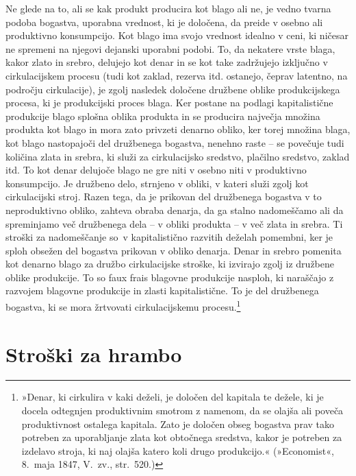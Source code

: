 \documentclass[kapital_02.tex]{subfiles}
\begin{document}
Ne glede na to, ali se kak produkt producira kot blago ali ne, je vedno tvarna podoba bogastva, uporabna vrednost, ki je določena, da preide v osebno ali produktivno konsumpcijo.
Kot blago ima svojo vrednost idealno v ceni, ki ničesar ne spremeni na njegovi dejanski uporabni podobi.
To, da nekatere vrste blaga, kakor zlato in srebro, delujejo kot denar in se kot take zadržujejo izključno v cirkulacijskem procesu (tudi kot zaklad, rezerva itd. ostanejo, čeprav latentno, na področju cirkulacije), je zgolj nasledek določene družbene oblike produkcijskega procesa, ki je produkcijski proces blaga.
Ker postane na podlagi kapitalistične produkcije blago splošna oblika produkta in se producira največja množina produkta kot blago in mora zato privzeti denarno obliko, ker torej množina blaga, kot blago nastopajoči del družbenega bogastva, nenehno raste -- se povečuje tudi količina zlata in srebra, ki služi za cirkulacijsko sredstvo, plačilno sredstvo, zaklad itd.
To kot denar delujoče blago ne gre niti v osebno niti v produktivno konsumpcijo.
Je družbeno delo, strnjeno v obliki, v kateri služi zgolj kot cirkulacijski stroj.
Razen tega, da je prikovan del družbenega bogastva v to neproduktivno obliko, zahteva obraba denarja, da ga stalno nadomeščamo ali da spreminjamo več družbenega dela -- v obliki produkta -- v več zlata in srebra.
Ti stroški za nadomeščanje so\KPEstran\ v kapitalistično razvitih deželah pomembni, ker je sploh obsežen del bogastva prikovan v obliko denarja.
Denar in srebro pomenita kot denarno blago za družbo cirkulacijske stroške, ki izvirajo zgolj iz družbene oblike produkcije.
To so faux frais blagovne produkcije nasploh, ki naraščajo z razvojem blagovne produkcije in zlasti kapitalistične.
To je del družbenega bogastva, ki se mora žrtvovati cirkulacijskemu procesu.\footnote
{»Denar, ki cirkulira v kaki deželi, je določen del kapitala te dežele, ki je docela odtegnjen produktivnim smotrom z namenom, da se olajša ali poveča produktivnost ostalega kapitala.
Zato je določen obseg bogastva prav tako potreben za uporabljanje zlata kot obtočnega sredstva, kakor je potreben za izdelavo stroja, ki naj olajša katero koli drugo produkcijo.« (»Economist«, 8.\ maja 1847, V.\ zv., str.\ 520.)}

\section{Stroški za hrambo}
\end{document}
